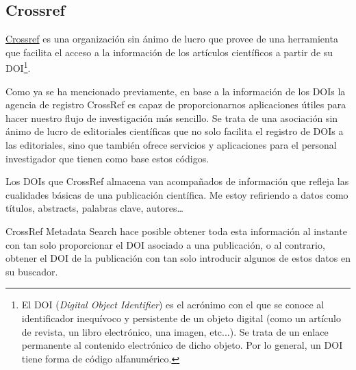 \subsection{Crossref}

 \href{https://www.crossref.org/}{Crossref} es una organización sin ánimo de lucro que provee de una herramienta que facilita el acceso a la información de los artículos científicos a partir de su DOI\footnote{El DOI (\textit{Digital Object Identifier}) es el acrónimo con el que se conoce al identificador inequívoco y persistente de un objeto digital (como un artículo de revista, un libro electrónico, una imagen, etc...). Se trata de un enlace permanente al contenido electrónico de dicho objeto. Por lo general, un DOI tiene forma de código alfanumérico.}.

Como ya se ha mencionado previamente, en base a la información de los DOIs la agencia de registro CrossRef es capaz de proporcionarnos aplicaciones útiles para hacer nuestro flujo de investigación más sencillo.
Se trata de una asociación sin ánimo de lucro de editoriales científicas que no solo facilita el registro de DOIs a las editoriales, sino que también ofrece servicios y aplicaciones para el personal investigador que tienen como base estos códigos.

Los DOIs que CrossRef almacena van acompañados de información que refleja las cualidades básicas de una publicación científica. Me estoy refiriendo a datos como títulos, abstracts, palabras clave, autores…

CrossRef Metadata Search hace posible obtener toda esta información al instante con tan solo proporcionar el DOI asociado a una publicación, o al contrario, obtener el DOI de la publicación con tan solo introducir algunos de estos datos en su buscador.








